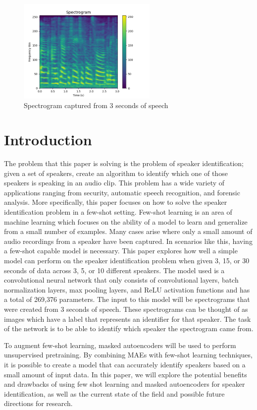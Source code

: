 \documentclass{article}
\begin{document}
\begin{figure}
  \centering
  \includegraphics[width=0.6\textwidth]{Images/spectrogram_example.png}
  \caption{Spectrogram captured from 3 seconds of speech}
  \label{fig:SpectrogramExample}
\end{figure}

\section{Introduction}
The problem that this paper is solving is the problem of speaker identification; given a set of speakers, create an
algorithm to identify which one of those speakers is speaking in an audio clip. This problem has a wide variety of 
applications ranging from security, automatic speech recognition, and forensic analysis. More specifically, this paper focuses
on how to solve the speaker identification problem in a few-shot setting. Few-shot learning is an area of machine learning
which focuses on the ability of a model to learn and generalize from a small number of examples. Many cases arise
where only a small amount of audio recordings from a speaker have been captured. In scenarios like this, having a few-shot
capable model is necessary. This paper explores how well a simple model can perform on the speaker identification problem when given 3, 15, or
30 seconds of data across 3, 5, or 10 different speakers. The model used is a convolutional neural network that only
consists of convolutional layers, batch normalization layers, max pooling layers, and ReLU activation functions and has a
total of 269,376 parameters. The input to this model will be spectrograms that were created from 3 seconds 
of speech. These spectrograms can be thought of as images which have a label that represents an identifier for that speaker. 
The task of the network is to be able to identify which speaker the spectrogram came from.

To augment few-shot learning, masked autoencoders will be used to perform unsupervised pretraining. By combining MAEs with
few-shot learning techniques, it is possible to create a model that can accurately identify speakers based on a small 
amount of input data. In this paper, we will explore the potential benefits and drawbacks of using few shot learning and
masked autoencoders for speaker identification, as well as the current state of the field and possible future directions
for research.
\end{document}
